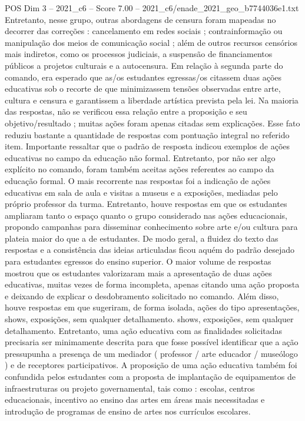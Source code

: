\begin{textsample}{POS Dim 3 – 2021\_c6 – Score 7.00 – 2021\_c6/enade\_2021\_geo\_b7744036e1.txt}
Entretanto, nesse grupo, outras abordagens de censura foram mapeadas no decorrer das correções : cancelamento em redes sociais ; contrainformação ou manipulação dos meios de comunicação social ; além de outros recursos censórios mais indiretos, como os processos judiciais, a suspensão de financiamentos públicos a projetos culturais e a autocensura.
Em relação à segunda parte do comando, era esperado que as/os estudantes egressas/os citassem duas ações educativas sob o recorte de que minimizassem tensões observadas entre arte, cultura e censura e garantissem a liberdade artística prevista pela lei.
Na maioria das respostas, não se verificou essa relação entre a proposição e seu objetivo/resultado ; muitas ações foram apenas citadas sem explicações.
Esse fato reduziu bastante a quantidade de respostas com pontuação integral no referido item.
Importante ressaltar que o padrão de resposta indicou exemplos de ações educativas no campo da educação não formal.
Entretanto, por não ser algo explícito no comando, foram também aceitas ações referentes ao campo da educação formal.
O mais recorrente nas respostas foi a indicação de ações educativas em sala de aula e visitas a museus e a exposições, mediadas pelo próprio professor da turma.
Entretanto, houve respostas em que os estudantes ampliaram tanto o espaço quanto o grupo considerado nas ações educacionais, propondo campanhas para disseminar conhecimento sobre arte e/ou cultura para plateia maior do que a de estudantes.
De modo geral, a fluidez do texto das respostas e a consistência das ideias articuladas ficou aquém do padrão desejado para estudantes egressos do ensino superior.
O maior volume de respostas mostrou que os estudantes valorizaram mais a apresentação de duas ações educativas, muitas vezes de forma incompleta, apenas citando uma ação proposta e deixando de explicar o desdobramento solicitado no comando.
Além disso, houve respostas em que sugeriram, de forma isolada, ações do tipo apresentações, shows, exposições, sem qualquer detalhamento. shows, exposições, sem qualquer detalhamento.
Entretanto, uma ação educativa com as finalidades solicitadas precisaria ser minimamente descrita para que fosse possível identificar que a ação pressupunha a presença de um mediador ( professor / arte educador / museólogo ) e de receptores participativos.
A proposição de uma ação educativa também foi confundida pelos estudantes com a proposta de implantação de equipamentos de infraestruturas ou projeto governamental, tais como : escolas, centros educacionais, incentivo ao ensino das artes em áreas mais necessitadas e introdução de programas de ensino de artes nos currículos escolares.

\end{textsample}
